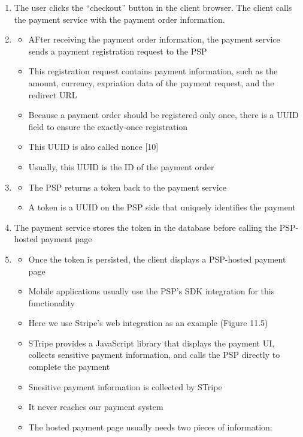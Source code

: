 \documentclass{report}
\theoremstyle{definition}
\begin{document}
\begin{enumerate}
\item
The user clicks the ``checkout'' button in the client browser. The client calls the payment service with the payment order information.

\item

\begin{itemize}
\item
AFter receiving the payment order information, the payment service sends a payment registration request to the PSP
\item
This registration request contains payment information, such as the amount, currency, expriation data of the payment request, and the redirect URL
\item
Because a payment order should be registered only once, there is a UUID field to ensure the exactly-once registration
\item
This UUID is also called nonce [10]
\item
Usually, this UUID is the ID of the payment order
\end{itemize}
\item

\begin{itemize}
\item
The PSP returns a token back to the payment service
\item
A token is a UUID on the PSP side that uniquely identifies the payment
\end{itemize}

\item
The payment service stores the token in the database before calling the PSP-hosted payment page

\item

\begin{itemize}
\item
Once the token is persisted, the client displays a PSP-hosted payment page
\item
Mobile applications usually use the PSP's SDK integration for this functionality
\item
Here we use Stripe's web integration as an example (Figure 11.5)
\item
STripe provides a JavaScript library that displays the payment UI, collects sensitive payment information, and calls the PSP directly to complete the payment
\item
Snesitive payment information is collected by STripe
\item
It never reaches our payment system
\item
The hosted payment page usually needs two pieces of information:


\end{itemize}
\end{enumerate}
\end{document}
